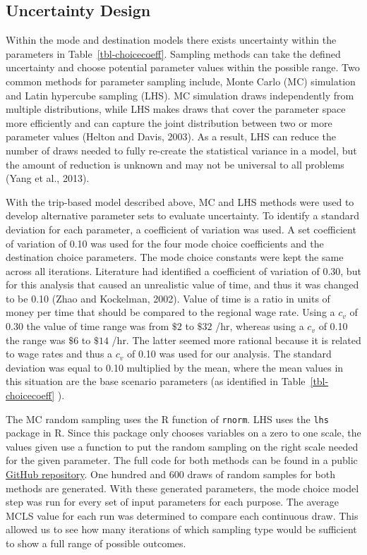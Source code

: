 \documentclass[
  futuretransp,
  submit,
  moreauthors,
]{Definitions/mdpi}
\begin{document}
\subsection{Uncertainty Design}\label{uncertainty-design}

Within the mode and destination models there exists uncertainty within
the parameters in Table~\ref{tbl-choicecoeff}. Sampling methods can take
the defined uncertainty and choose potential parameter values within the
possible range. Two common methods for parameter sampling include, Monte
Carlo (MC) simulation and Latin hypercube sampling (LHS). MC simulation
draws independently from multiple distributions, while LHS makes draws
that cover the parameter space more efficiently and can capture the
joint distribution between two or more parameter values (Helton and
Davis, 2003). As a result, LHS can reduce the number of draws needed to
fully re-create the statistical variance in a model, but the amount of
reduction is unknown and may not be universal to all problems (Yang et
al., 2013).

With the trip-based model described above, MC and LHS methods were used
to develop alternative parameter sets to evaluate uncertainty. To
identify a standard deviation for each parameter, a coefficient of
variation was used. A set coefficient of variation of 0.10 was used for
the four mode choice coefficients and the destination choice parameters.
The mode choice constants were kept the same across all iterations.
Literature had identified a coefficient of variation of 0.30, but for
this analysis that caused an unrealistic value of time, and thus it was
changed to be 0.10 (Zhao and Kockelman, 2002). Value of time is a ratio
in units of money per time that should be compared to the regional wage
rate. Using a \(c_v\) of 0.30 the value of time range was from \(\$2\)
to \(\$32\) /hr, whereas using a \(c_v\) of 0.10 the range was \(\$6\)
to \(\$14\) /hr. The latter seemed more rational because it is related
to wage rates and thus a \(c_v\) of 0.10 was used for our analysis. The
standard deviation was equal to 0.10 multiplied by the mean, where the
mean values in this situation are the base scenario parameters (as
identified in Table~\ref{tbl-choicecoeff} ).

The MC random sampling uses the R function of \texttt{rnorm}. LHS uses
the \texttt{lhs} package in R. Since this package only chooses variables
on a zero to one scale, the values given use a function to put the
random sampling on the right scale needed for the given parameter. The
full code for both methods can be found in a public
\href{https://github.com/natmaegray/sensitivity_thesis}{GitHub
repository}. One hundred and 600 draws of random samples for both
methods are generated. With these generated parameters, the mode choice
model step was run for every set of input parameters for each purpose.
The average MCLS value for each run was determined to compare each
continuous draw. This allowed us to see how many iterations of which
sampling type would be sufficient to show a full range of possible
outcomes.
\end{document}
